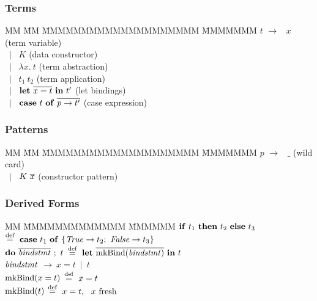 \bigskip
\bigskip
\vspace{-2em}
\subsubsection{Terms}
\vspace{-1ex}
\begin{tabbing}
MM 	\= MM \= MMMMMMMMMMMMMMMMMMMM \= MMMMMMM \kill
$t$ 	\> $\to$ 	\> \ $x$						\> (term variable) 	\\
	\> \ $\mid$	\> \ $K$						\> (data constructor)	\\
	\> \ $\mid$	\> \ $\lambda x. \ t$					\> (term abstraction) 	\\
	\> \ $\mid$	\> \ $t_1 \ t_2$					\> (term application) 	\\
	\> \ $\mid$	\> \ $\textrm{\textbf{let}} \ \overline{x = t} \ \textrm{\textbf{in}} \ t'$		\> (let bindings) 	\\
	\> \ $\mid$	\> \ $\textrm{\textbf{case}} \ t \ \textrm{\textbf{of}} \ \overline{p \to t'}$		\> (case expression) 
\end{tabbing}

\vspace{-2em}
\subsubsection{Patterns}
\vspace{-1ex}
\begin{tabbing}
MM 	\= MM \= MMMMMMMMMMMMMMMMMMMM \= MMMMMMM \kill
$p$ 	\> $\to$ 	\> \ $\_$						\> (wild card) \\
	\> \ $\mid$	\> \ $K \ \overline{x}$					\> (constructor pattern) 
\end{tabbing}

\vspace{-2em}
\subsubsection{Derived Forms}
\vspace{-1ex}
\begin{tabbing}
MM	\= MMMMMMMMMMMMM \= MMMMMM \kill	
	\> $\kif \ t_1 \ \kthen \ t_2 \ \kelse \ t_3$
		\> $\stackrel{\textrm{def}}{=} \ \textrm{\textbf{case}} \ t_1 \ \textrm{\textbf{of}} \ \{ \operatorname{\mathit{True}} \to t_2; \ \operatorname{\mathit{False}} \to t_3 \}$ 
	\\[2ex]

	\> $\textrm{\textbf{do}} \ \overline{\operatorname{\mathit{bindstmt}}} \ ; \ t$
		\> $\stackrel{\textrm{def}}{=} \ \textrm{\textbf{let}} \ \overline{\textrm{mkBind}(\operatorname{\mathit{bindstmt}})} \ \textrm{\textbf{in}} \ t$
	\\[1ex]
	\>  $\operatorname{\mathit{bindstmt}}$		\> $\to \ x = t \ \mid \ t$ 
	\\
	\> \hspace{2.6em} $\textrm{mkBind}(x = t)$	\> $\stackrel{\textrm{def}}{=} \ x = t$ \\
	\> \hspace{2.6em} $\textrm{mkBind}(t)$ 	\> $\stackrel{\textrm{def}}{=} \ x = t, \ \ x \ \textrm{fresh}$ 
\end{tabbing}

